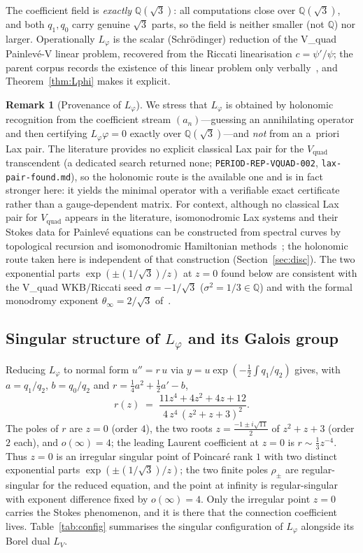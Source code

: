 \documentclass[11pt,reqno]{amsart}
\theoremstyle{plain}
\theoremstyle{definition}
\newtheorem{remark}[theorem]{Remark}
\newcommand{\Vquad}{V_{\mathrm{quad}}}
\newcommand{\Lphi}{L_{\varphi}}
\newcommand{\LV}{L_{V}}
\newcommand{\Qsqrt}{\mathbb{Q}(\sqrt3)}
\begin{document}
The coefficient field is \emph{exactly} $\Qsqrt$: all computations close over $\Qsqrt$, and both
$q_1,q_0$ carry genuine $\sqrt3$ parts, so the field is neither smaller (not $\mathbb{Q}$) nor
larger. Operationally $\Lphi$ is the scalar (Schr\"odinger) reduction of the V\_quad Painlev\'e-V
linear problem, recovered from the Riccati linearisation $c=\psi'/\psi$; the parent corpus
records the existence of this linear problem only verbally~\cite{Vquad}, and Theorem~\ref{thm:Lphi}
makes it explicit.

\begin{remark}[Provenance of $\Lphi$]\label{rmk:provenance}
We stress that $\Lphi$ is obtained by holonomic recognition from the coefficient stream
$(a_n)$---guessing an annihilating operator and then certifying $\Lphi\varphi=0$ exactly over
$\Qsqrt$---and \emph{not} from an a~priori Lax pair. The literature provides no explicit classical
Lax pair for the $\Vquad$ transcendent (a dedicated search returned none;
\texttt{PERIOD-REP-VQUAD-002}, \texttt{lax-pair-found.md}), so the holonomic route is the available
one and is in fact stronger here: it yields the minimal operator with a verifiable exact
certificate rather than a gauge-dependent matrix. For context, although no classical Lax pair for
$\Vquad$ appears in the literature, isomonodromic Lax systems and their Stokes data for
Painlev\'e equations can be constructed from spectral curves by topological recursion and
isomonodromic Hamiltonian methods~\cite{MarchalOrantin,IwakiMarchalSaenz,MarchalAlameddine}; the
holonomic route taken here is independent of that construction (Section~\ref{sec:disc}). The two
exponential parts
$\exp(\pm(1/\sqrt3)/z)$ at $z=0$ found below are consistent with the V\_quad WKB/Riccati seed
$\sigma=-1/\sqrt3$ ($\sigma^2=1/3\in\mathbb{Q}$) and with the formal monodromy exponent
$\theta_\infty=2/\sqrt3$ of~\cite{Vquad}.
\end{remark}

\subsection{Singular structure of \texorpdfstring{$\Lphi$}{Lphi} and its Galois group}
Reducing $\Lphi$ to normal form $u''=r\,u$ via $y=u\exp(-\tfrac12\int q_1/q_2)$ gives, with
$a=q_1/q_2$, $b=q_0/q_2$ and $r=\tfrac14a^2+\tfrac12a'-b$,
\begin{equation}\label{eq:r}
  r(z)\;=\;\frac{11z^4+4z^2+4z+12}{\,4\,z^4\,(z^2+z+3)^2\,}.
\end{equation}
The poles of $r$ are $z=0$ (order $4$), the two roots $z=\tfrac{-1\pm i\sqrt{11}}2$ of $z^2+z+3$
(order $2$ each), and $o(\infty)=4$; the leading Laurent coefficient at $z=0$ is
$r\sim\tfrac13 z^{-4}$. Thus $z=0$ is an irregular singular point of Poincar\'e rank $1$ with two
distinct exponential parts $\exp(\pm(1/\sqrt3)/z)$; the two finite poles $\rho_\pm$ are
regular-singular for the reduced equation, and the point at infinity is regular-singular with
exponent difference fixed by $o(\infty)=4$. Only the irregular point $z=0$ carries the Stokes
phenomenon, and it is there that the connection coefficient lives. Table~\ref{tab:config}
summarises the singular configuration of $\Lphi$ alongside its Borel dual $\LV$.
\end{document}
